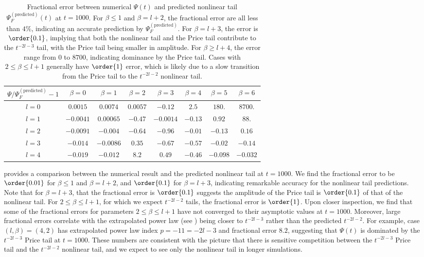 \begin{table}[t]
  \centering
  \begin{tabular}{|c|c|c|c|c|c|c|c|}
    \hline
    $ \Psi / \Psi_F^{\mathrm{(predicted)}} - 1$ & $\beta=0$ & $\beta=1$ & $\beta=2$ & $\beta=3$ & $\beta=4$ & $\beta=5$ & $\beta=6$ \\
    \hline
    $l=0$ & $0.0015$ & $0.0074$ & $0.0057$ & $-0.12$ & $2.5$ & $180.$ & $8700.$\\
    $l=1$ & $-0.0041$ & $0.00065$ & $-0.47$ & $-0.0014$ & $-0.13$ & $0.92$ & $88.$\\
    $l=2$ & $-0.0091$ & $-0.004$ & $-0.64$ & $-0.96$ & $-0.01$ & $-0.13$ & $0.16$\\
    $l=3$ & $-0.014$ & $-0.0086$ & $0.35$ & $-0.67$ & $-0.57$ & $-0.02$ & $-0.14$\\
    $l=4$ & $-0.019$ & $-0.012$ & $8.2$ & $0.49$ & $-0.46$ & $-0.098$ & $-0.032$ \\
    \hline
  \end{tabular}
  \caption{Fractional error between numerical $\Psi(t)$ and predicted nonlinear tail $\Psi_F^{\mathrm{(predicted)}}(t)$ at $t = 1000$.
    For $\beta \leq 1$ and $\beta = l+2$, the fractional error are all less than $4\%$, indicating an accurate prediction by $\Psi_F^{\mathrm{(predicted)}}$.
    For $\beta = l+3$, the error is $\order{0.1}$, implying that both the nonlinear tail and the Price tail contribute to the $t^{-2l-3}$ tail, with the Price tail being smaller in amplitude.
    For $\beta \geq l+4$, the error range from $0$ to $8700$, indicating dominance by the Price tail.
    Cases with $2 \leq \beta \leq l+1$ generally have $\order{1}$ error, which is likely due to a slow transition from the Price tail to the $t^{-2l-2}$ nonlinear tail.
  }
  \label{tab:nonlinear_tail_amplitude_comparison}
\end{table}

 provides a comparison between the numerical result and the predicted nonlinear tail at $t=1000$.
We find the fractional error to be $\order{0.01}$ for $\beta \leq 1$ and $\beta = l+2$, and $\order{0.1}$ for $\beta = l+3$, indicating remarkable accuracy for the nonlinear tail predictions.
Note that for $\beta = l+3$, that the fractional error is $\order{0.1}$ suggests the amplitude of the Price tail is $\order{0.1}$ of that of the nonlinear tail.
For $2 \leq \beta \leq l+1$, for which we expect $t^{-2l-2}$ tails, the fractional error is $\order{1}$.
Upon closer inspection, we find that some of the fractional errors for parameters $2 \leq \beta \leq l+1$ have not converged to their asymptotic values at $t=1000$.
Moreover, large fractional errors correlate with the extrapolated power law (see ) being closer to $t^{-2l-3}$ rather than the predicted $t^{-2l-2}$.
For example, case $(l,\beta) = (4,2)$ has extrapolated power law index $p=-11=-2l-3$ and fractional error $8.2$, suggesting that $\Psi(t)$ is dominated by the $t^{-2l-3}$ Price tail at $t=1000$.
These numbers are consistent with the picture that there is sensitive competition between the $t^{-2l-3}$ Price tail and the $t^{-2l-2}$ nonlinear tail, and we expect to see only the nonlinear tail in longer simulations.


